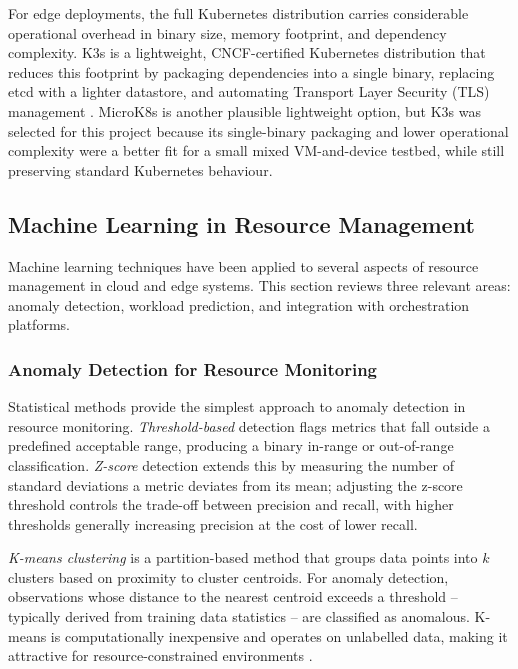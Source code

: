 For edge deployments, the full Kubernetes distribution carries considerable operational overhead in binary size, memory footprint, and dependency complexity. K3s is a lightweight, CNCF-certified Kubernetes distribution that reduces this footprint by packaging dependencies into a single binary, replacing etcd with a lighter datastore, and automating Transport Layer Security (TLS) management \cite{kim2025exploring}. MicroK8s is another plausible lightweight option, but K3s was selected for this project because its single-binary packaging and lower operational complexity were a better fit for a small mixed VM-and-device testbed, while still preserving standard Kubernetes behaviour.

\subsection{Machine Learning in Resource Management}

Machine learning techniques have been applied to several aspects of resource management in cloud and edge systems. This section reviews three relevant areas: anomaly detection, workload prediction, and integration with orchestration platforms.

\subsubsection{Anomaly Detection for Resource Monitoring}

Statistical methods provide the simplest approach to anomaly detection in resource monitoring. \textit{Threshold-based} detection flags metrics that fall outside a predefined acceptable range, producing a binary in-range or out-of-range classification. \textit{Z-score} detection extends this by measuring the number of standard deviations a metric deviates from its mean; adjusting the z-score threshold controls the trade-off between precision and recall, with higher thresholds generally increasing precision at the cost of lower recall.

\textit{K-means clustering} is a partition-based method that groups data points into $k$ clusters based on proximity to cluster centroids. For anomaly detection, observations whose distance to the nearest centroid exceeds a threshold -- typically derived from training data statistics -- are classified as anomalous. K-means is computationally inexpensive and operates on unlabelled data, making it attractive for resource-constrained environments \cite{fritzsche2024lightweight}.

